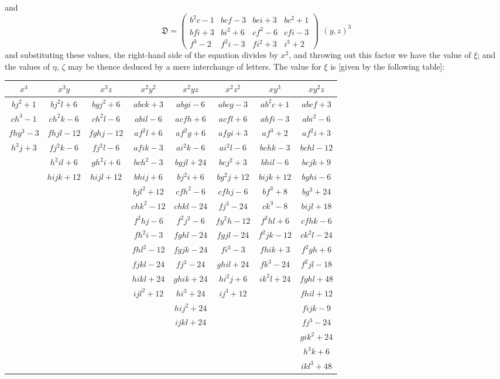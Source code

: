 \documentclass[12pt,a4paper]{article}
\begin{document}
and
\[
\mathfrak{D} =
\begin{pmatrix}
b^2c - 1 & bcf - 3 & bei + 3 & bc^2 + 1 \\
bfi + 3 & bi^2 + 6 & cf^2 - 6 & cfi - 3 \\
f^3 - 2 & f^2i - 3 & fi^2 + 3 & i^3 + 2
\end{pmatrix}
\!\!\:\, (y, z)^3
\]
and substituting these values, the right-hand side of the equation divides by $x^2$, and throwing out this factor we have the value of $\xi$; and the values of $\eta$, $\zeta$ may be thence deduced by a mere interchange of letters. The value for $\xi$ is [given by the following table]:

\begin{center}
\small
\begin{tabular}{|c|c|c|c|c|c|c|c|}
\hline
$x^4$ & $x^3y$ & $x^3z$ & $x^2y^2$ & $x^2yz$ & $x^2z^2$ & $xy^3$ & $xy^2z$ \\
\hline
$bj^2 + 1$ & $bj^2l + 6$ & $bgj^2 + 6$ & $abck + 3$ & $abgi - 6$ & $abcg - 3$ & $ab^2c + 1$ & $abcf + 3$ \\
$ch^3 - 1$ & $ch^2k - 6$ & $ch^2l - 6$ & $abil - 6$ & $acfh + 6$ & $acfl + 6$ & $abfi - 3$ & $abi^2 - 6$ \\
$fhy^3 - 3$ & $fhjl - 12$ & $fghj - 12$ & $af^2l + 6$ & $af^2g + 6$ & $afgi + 3$ & $af^3 + 2$ & $af^2i + 3$ \\
$h^3j + 3$ & $fj^2k - 6$ & $fj^2l - 6$ & $afik - 3$ & $ai^2k - 6$ & $ai^2l - 6$ & $bchk - 3$ & $bchl - 12$ \\
& $h^2il + 6$ & $gh^2i + 6$ & $bch^2 - 3$ & $bgjl + 24$ & $bcj^2 + 3$ & $bhil - 6$ & $bcjk + 9$ \\
& $hijk + 12$ & $hijl + 12$ & $bhij + 6$ & $bj^2i + 6$ & $bg^2j + 12$ & $bijk + 12$ & $bghi - 6$ \\
& & & $bjl^2 + 12$ & $cfh^2 - 6$ & $cfhj - 6$ & $bf^3 + 8$ & $bg^3 + 24$ \\
& & & $chk^2 - 12$ & $chkl - 24$ & $fj^3 - 24$ & $ck^3 - 8$ & $bijl + 18$ \\
& & & $f^2hj - 6$ & $f^2j^2 - 6$ & $fy^2h - 12$ & $f^2hl + 6$ & $cfhk - 6$ \\
& & & $fh^2i - 3$ & $fghl - 24$ & $fgjl - 24$ & $f^2jk - 12$ & $ck^2l - 24$ \\
& & & $fhl^2 - 12$ & $fgjk - 24$ & $fi^3 - 3$ & $fhik + 3$ & $f^2gh + 6$ \\
& & & $fjkl - 24$ & $fj^3 - 24$ & $ghil + 24$ & $fk^3 - 24$ & $f^2jl - 18$ \\
& & & $hikl + 24$ & $ghik + 24$ & $hi^2j + 6$ & $ik^2l + 24$ & $fghl + 48$ \\
& & & $ijl^2 + 12$ & $hi^3 + 24$ & $ij^3 + 12$ & & $fhil + 12$ \\
& & & & $hij^2 + 24$ & & & $fijk - 9$ \\
& & & & $ijkl + 24$ & & & $fj^3 - 24$ \\
& & & & & & & $gik^2 + 24$ \\
& & & & & & & $h^3k + 6$ \\
& & & & & & & $ikl^3 + 48$ \\
\hline
\end{tabular}
\end{center}
\end{document}
